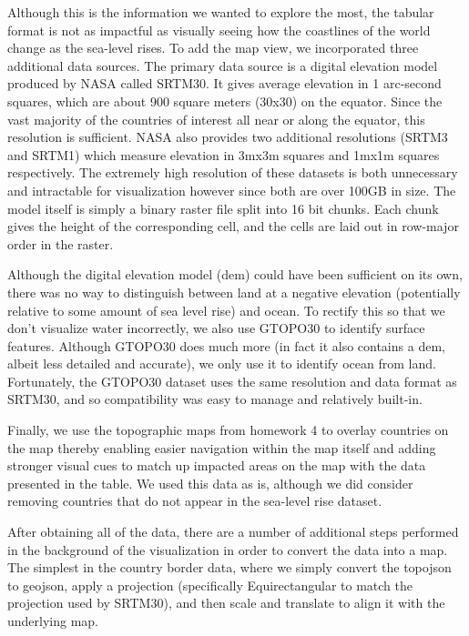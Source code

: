 \documentclass[12pt]{article}
\begin{document}
		Although this is the information we wanted to explore the most, the tabular format is not as impactful as visually seeing how the coastlines of the world change as the sea-level rises.
		To add the map view, we incorporated three additional data sources.
		The primary data source is a digital elevation model produced by NASA called SRTM30.
		It gives average elevation in 1 arc-second squares, which are about 900 square meters (30x30) on the equator.
		Since the vast majority of the countries of interest all near or along the equator, this resolution is sufficient.
		NASA also provides two additional resolutions (SRTM3 and SRTM1) which measure elevation in 3mx3m squares and 1mx1m squares respectively.
		The extremely high resolution of these datasets is both unnecessary and intractable for visualization however since both are over 100GB in size.
		The model itself is simply a binary raster file split into 16 bit chunks.
		Each chunk gives the height of the corresponding cell, and the cells are laid out in row-major order in the raster.

		Although the digital elevation model (dem) could have been sufficient on its own, there was no way to distinguish between land at a negative elevation (potentially relative to some amount of sea level rise) and ocean.
		To rectify this so that we don’t visualize water incorrectly, we also use GTOPO30 to identify surface features.
		Although GTOPO30 does much more (in fact it also contains a dem, albeit less detailed and accurate), we only use it to identify ocean from land.
		Fortunately, the GTOPO30 dataset uses the same resolution and data format as SRTM30, and so compatibility was easy to manage and relatively built-in.

		Finally, we use the topographic maps from homework 4 to overlay countries on the map thereby enabling easier navigation within the map itself and adding stronger visual cues to match up impacted areas on the map with the data presented in the table.
		We used this data as is, although we did consider removing countries that do not appear in the sea-level rise dataset.

		After obtaining all of the data, there are a number of additional steps performed in the background of the visualization in order to convert the data into a map.
		The simplest in the country border data, where we simply convert the topojson to geojson, apply a projection (specifically Equirectangular to match the projection used by SRTM30), and then scale and translate to align it with the underlying map.
\end{document}
